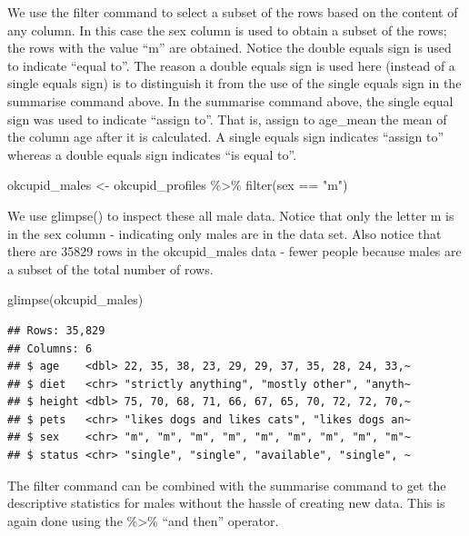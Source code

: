 \documentclass[
]{krantz}
\makeatletter
\newenvironment{Shaded}{\begin{snugshade}}{\end{snugshade}}
\newcommand{\FunctionTok}[1]{\textcolor[rgb]{0,0,0}{#1}}
\newcommand{\NormalTok}[1]{#1}
\newcommand{\OtherTok}[1]{\textcolor[rgb]{0.37,0.37,0.37}{#1}}
\newcommand{\SpecialCharTok}[1]{\textcolor[rgb]{0,0,0}{#1}}
\newcommand{\StringTok}[1]{\textcolor[rgb]{0.5,0.5,0.5}{#1}}
\newenvironment{kframe}{%
\medskip{}
\setlength{\fboxsep}{.8em}
 \def\at@end@of@kframe{}%
 \ifinner\ifhmode%
  \def\at@end@of@kframe{\end{minipage}}%
  \begin{minipage}{\columnwidth}%
 \fi\fi%
 \def\FrameCommand##1{\hskip\@totalleftmargin \hskip-\fboxsep
 \colorbox{shadecolor}{##1}\hskip-\fboxsep
     \hskip-\linewidth \hskip-\@totalleftmargin \hskip\columnwidth}%
 \MakeFramed {\advance\hsize-\width
   \@totalleftmargin\z@ \linewidth\hsize
   \@setminipage}}%
 {\par\unskip\endMakeFramed%
 \at@end@of@kframe}
\renewenvironment{Shaded}{\begin{kframe}}{\end{kframe}}
\makeatother
\begin{document}
We use the filter command to select a subset of the rows based on the content of any column. In this case the sex column is used to obtain a subset of the rows; the rows with the value ``m'' are obtained. Notice the double equals sign is used to indicate ``equal to''. The reason a double equals sign is used here (instead of a single equals sign) is to distinguish it from the use of the single equals sign in the summarise command above. In the summarise command above, the single equal sign was used to indicate ``assign to''. That is, assign to age\_mean the mean of the column age after it is calculated. A single equals sign indicates ``assign to'' whereas a double equals sign indicates ``is equal to''.

\begin{Shaded}
\begin{Highlighting}[]
\NormalTok{okcupid\_males }\OtherTok{\textless{}{-}}\NormalTok{ okcupid\_profiles }\SpecialCharTok{\%\textgreater{}\%}
  \FunctionTok{filter}\NormalTok{(sex }\SpecialCharTok{==} \StringTok{"m"}\NormalTok{)}
\end{Highlighting}
\end{Shaded}

We use glimpse() to inspect these all male data. Notice that only the letter m is in the sex column - indicating only males are in the data set. Also notice that there are 35829 rows in the okcupid\_males data - fewer people because males are a subset of the total number of rows.

\begin{Shaded}
\begin{Highlighting}[]
\FunctionTok{glimpse}\NormalTok{(okcupid\_males)}
\end{Highlighting}
\end{Shaded}

\begin{verbatim}
## Rows: 35,829
## Columns: 6
## $ age    <dbl> 22, 35, 38, 23, 29, 29, 37, 35, 28, 24, 33,~
## $ diet   <chr> "strictly anything", "mostly other", "anyth~
## $ height <dbl> 75, 70, 68, 71, 66, 67, 65, 70, 72, 72, 70,~
## $ pets   <chr> "likes dogs and likes cats", "likes dogs an~
## $ sex    <chr> "m", "m", "m", "m", "m", "m", "m", "m", "m"~
## $ status <chr> "single", "single", "available", "single", ~
\end{verbatim}

The filter command can be combined with the summarise command to get the descriptive statistics for males without the hassle of creating new data. This is again done using the \%\textgreater\% ``and then'' operator.
\end{document}
